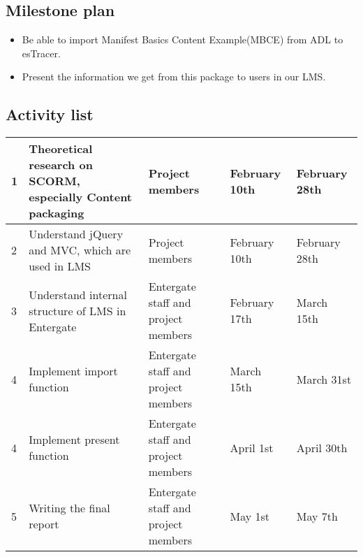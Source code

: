 \documentclass{report}
\begin{document}
\subsection{Milestone plan}
\begin{itemize}
	\item
		Be able to import Manifest Basics Content Example(MBCE) from ADL to esTracer.
	\item
		Present the information we get from this package to users in our LMS.
\end{itemize}
\subsection{Activity list}
\begin{table}[h]
	\begin{tabular}{|m{0.1cm} | m{5cm} | m{5cm} | m{2.5cm} | m{2.5cm} |}
		\hline
		1 & Theoretical research on SCORM, especially Content packaging & Project members & February 10th & February 28th \\
		\hline
		2 & Understand jQuery and MVC, which are used in LMS & Project members & February 10th & February 28th \\
		\hline
		3 & Understand internal structure of LMS in Entergate & Entergate staff and project members & February 17th & March 15th \\
		\hline
		4 & Implement import function & Entergate staff and project members & March 15th & March 31st \\
		\hline
		4 & Implement present function & Entergate staff and project members & April 1st & April 30th \\
		\hline
		5 & Writing the final report & Entergate staff and project members & May 1st & May 7th \\
		\hline
	\end{tabular}
\end{table}
\end{document}
